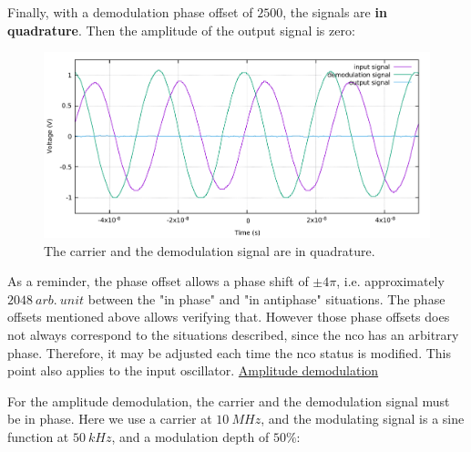 \documentclass[12pt,oneside]{article}
\begin{document}
Finally, with a demodulation phase offset of $2500$, the signals are \textbf{in quadrature}. Then the amplitude of the output signal is zero:

\begin{figure}[!h!tb]
	\begin{center}
		\includegraphics[width=13cm,trim={0cm 0cm 0cm 0cm}, clip]{scope/demods3.pdf}
		\caption{The carrier and the demodulation signal are in quadrature.}
		\label{curv:demodsine3}
	\end{center}
\end{figure}


As a reminder, the phase offset allows a phase shift of $\pm 4\pi$, i.e. approximately $2048~arb.~unit$ between the "in phase" and "in antiphase" situations. The phase offsets mentioned above allows verifying that. However those phase offsets does not always correspond to the situations described, since the nco has an arbitrary phase. Therefore, it may be adjusted each time the nco status is modified. This point also applies to the input oscillator. 
\newline\newline
\underline{Amplitude demodulation}\newline\newline

For the amplitude demodulation, the carrier and the demodulation signal must be in phase. Here we use a carrier at $10~MHz$, and the modulating signal is a sine function at $50~kHz$, and a modulation depth of $50\%$:
\end{document}
